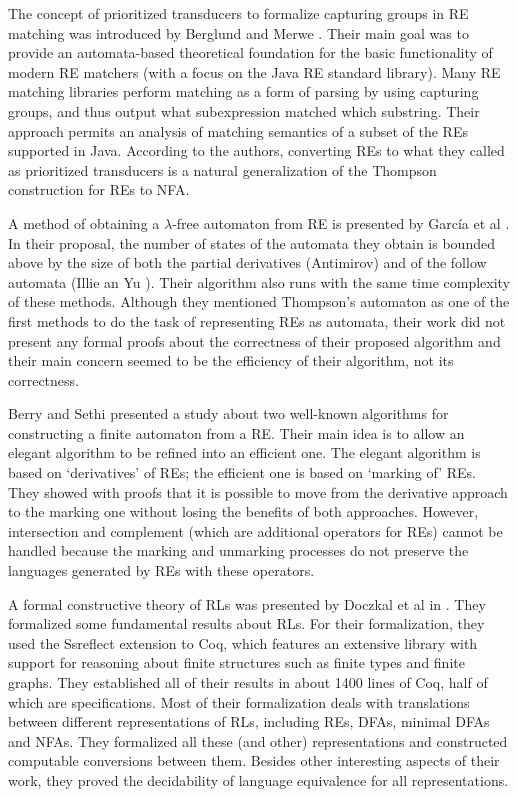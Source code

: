 \documentclass[oneside,12pt]{scrbook}
\theoremstyle{definition}
\theoremstyle{plain}
\theoremstyle{definition}
\begin{document}
The concept of prioritized transducers to formalize capturing groups in RE matching was introduced by Berglund and Merwe \cite{Berglund2016}. Their main goal was to provide an automata-based theoretical foundation for the basic functionality of modern RE matchers (with a focus on the Java RE standard library). Many RE matching libraries perform matching as a form of parsing by using capturing groups, and thus output what subexpression matched which substring. Their approach permits an analysis of matching semantics of a subset of the REs supported in Java. According to the authors, converting REs to what they called as prioritized transducers is a natural generalization of the Thompson construction for REs to NFA.

A method of obtaining a $\lambda$-free automaton from RE is presented by García et al \cite{Garcia2011}. In their proposal, the number of states of the automata they obtain is bounded above by the size of both the partial derivatives (Antimirov) and of the follow automata (Illie an Yu \cite{Ilie2003}). Their algorithm also runs with the same time complexity of these methods. Although they mentioned Thompson's automaton as one of the first methods to do the task of representing REs as automata, their work did not present any formal proofs about the correctness of their proposed algorithm and their main concern seemed to be the efficiency of their algorithm, not its correctness.

Berry and Sethi \cite{Berry1986} presented a study about two well-known algorithms for constructing a finite automaton from a RE. Their main idea is to allow an elegant algorithm to be refined into an efficient one. The elegant algorithm is based on `derivatives' of REs; the efficient one is based on `marking of' REs. They showed with proofs that it is possible to move from the derivative approach to the marking one without losing the benefits of both approaches. However, intersection and complement (which are additional operators for REs) cannot be handled because the marking and unmarking processes do not preserve the languages generated by REs with these operators.

A formal constructive theory of RLs was presented by Doczkal et al in \cite{Doczkal2013}. They formalized some fundamental results about RLs. For their formalization, they used the Ssreflect extension to Coq, which features an extensive library with support for reasoning about finite structures such as finite types and finite graphs. They established all of their results in about 1400 lines of Coq, half of which are specifications. Most of their formalization deals with translations between different representations of RLs, including REs, DFAs, minimal DFAs and NFAs. They formalized all these (and other) representations and constructed computable conversions between them. Besides other interesting aspects of their work, they proved the decidability of language equivalence for all representations. 
\end{document}
